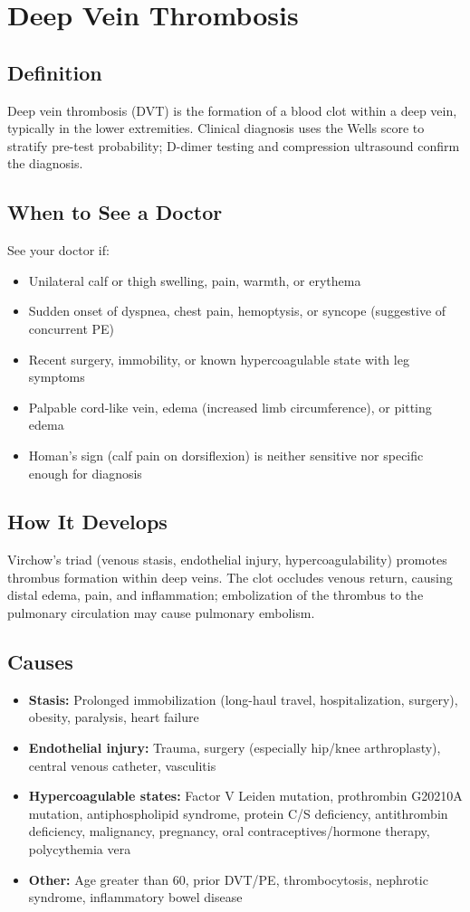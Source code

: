 \chapter{Deep Vein Thrombosis}

\section*{Definition}
Deep vein thrombosis (DVT) is the formation of a blood clot within a deep vein, typically in the lower extremities. Clinical diagnosis uses the Wells score to stratify pre-test probability; D-dimer testing and compression ultrasound confirm the diagnosis.

\section*{When to See a Doctor}
See your doctor if:
\begin{itemize}
  \item Unilateral calf or thigh swelling, pain, warmth, or erythema
  \item Sudden onset of dyspnea, chest pain, hemoptysis, or syncope (suggestive of concurrent PE)
  \item Recent surgery, immobility, or known hypercoagulable state with leg symptoms
  \item Palpable cord-like vein, edema (increased limb circumference), or pitting edema
  \item Homan's sign (calf pain on dorsiflexion) is neither sensitive nor specific enough for diagnosis
\end{itemize}

\section*{How It Develops}
Virchow's triad (venous stasis, endothelial injury, hypercoagulability) promotes thrombus formation within deep veins. The clot occludes venous return, causing distal edema, pain, and inflammation; embolization of the thrombus to the pulmonary circulation may cause pulmonary embolism.

\section*{Causes}
\begin{itemize}
  \item \textbf{Stasis:} Prolonged immobilization (long-haul travel, hospitalization, surgery), obesity, paralysis, heart failure
  \item \textbf{Endothelial injury:} Trauma, surgery (especially hip/knee arthroplasty), central venous catheter, vasculitis
  \item \textbf{Hypercoagulable states:} Factor V Leiden mutation, prothrombin G20210A mutation, antiphospholipid syndrome, protein C/S deficiency, antithrombin deficiency, malignancy, pregnancy, oral contraceptives/hormone therapy, polycythemia vera
  \item \textbf{Other:} Age greater than 60, prior DVT/PE, thrombocytosis, nephrotic syndrome, inflammatory bowel disease
\end{itemize}

